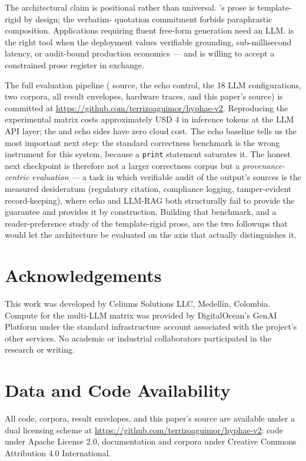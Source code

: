 The architectural claim is positional rather than universal.
\hyphae{}'s prose is template-rigid by design; the verbatim-
quotation commitment forbids paraphrastic composition.
Applications requiring fluent free-form generation need an
LLM. \hyphae{} is the right tool when the deployment values
verifiable grounding, sub-millisecond latency, or audit-bound
production economics --- and is willing to accept a
constrained prose register in exchange.

The full evaluation pipeline (\hyphae{} source, the echo control,
the 18 LLM configurations, two corpora, all result envelopes,
hardware traces, and this paper's source) is committed at
\url{https://github.com/terrizoaguimor/hyphae-v2}. Reproducing
the experimental matrix costs approximately USD 4 in inference
tokens at the LLM API layer; the \hyphae{} and echo sides have
zero cloud cost. The echo baseline tells us the most important
next step: the standard correctness benchmark is the wrong
instrument for this system, because a \texttt{print} statement
saturates it. The honest next checkpoint is therefore not a
larger correctness corpus but a \emph{provenance-centric
evaluation} --- a task in which verifiable audit of the output's
sources is the measured desideratum (regulatory citation,
compliance logging, tamper-evident record-keeping), where echo
and LLM-RAG both structurally fail to provide the guarantee and
\hyphae{} provides it by construction. Building that benchmark,
and a reader-preference study of the template-rigid prose, are
the two followups that would let the architecture be evaluated on
the axis that actually distinguishes it.

\section*{Acknowledgements}

This work was developed by Celiums Solutions LLC, Medell\'in,
Colombia. Compute for the multi-LLM matrix was provided by
DigitalOcean's GenAI Platform under the standard infrastructure
account associated with the project's other services. No
academic or industrial collaborators participated in the
research or writing.

\section*{Data and Code Availability}

All code, corpora, result envelopes, and this paper's source
are available under a dual licensing scheme at
\url{https://github.com/terrizoaguimor/hyphae-v2}: code under
Apache License 2.0, documentation and corpora under Creative
Commons Attribution 4.0 International.
